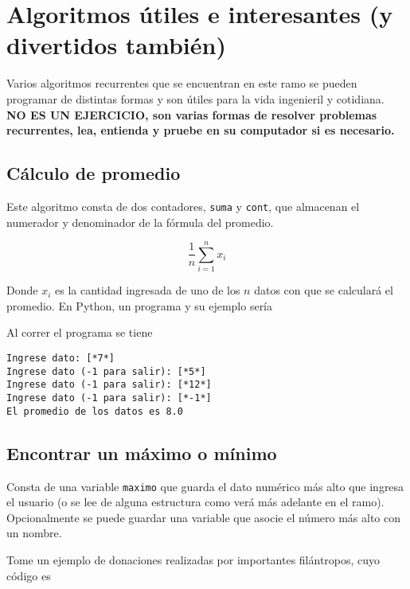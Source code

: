 \section{Algoritmos útiles e interesantes (y divertidos también)}

Varios algoritmos recurrentes que se encuentran en este ramo se pueden programar de distintas formas y son útiles para la vida ingenieril y cotidiana. \textbf{NO ES UN EJERCICIO, son varias formas de resolver problemas recurrentes, lea, entienda y pruebe en su computador si es necesario.}

\subsection{Cálculo de promedio}

Este algoritmo consta de dos contadores, \texttt{suma} y \texttt{cont}, que almacenan el numerador y denominador de la fórmula del promedio.

$$ \frac{1}{n}\sum_{i=1}^{n} x_{i} $$

Donde $x_i$ es la cantidad ingresada de uno de los $n$ datos con que se calculará el promedio. En Python, un programa y su ejemplo sería


    
    
Al correr el programa se tiene

\begin{lstlisting}[style=consola]
Ingrese dato: [*7*]
Ingrese dato (-1 para salir): [*5*]
Ingrese dato (-1 para salir): [*12*]
Ingrese dato (-1 para salir): [*-1*]
El promedio de los datos es 8.0
\end{lstlisting}

\subsection{Encontrar un máximo o mínimo}

Consta de una variable \texttt{maximo} que guarda el dato numérico más alto que ingresa el usuario (o se lee de alguna estructura como verá más adelante en el ramo). Opcionalmente se puede guardar una variable que asocie el número más alto con un nombre. 

Tome un ejemplo de donaciones realizadas por importantes filántropos, cuyo código es

    

